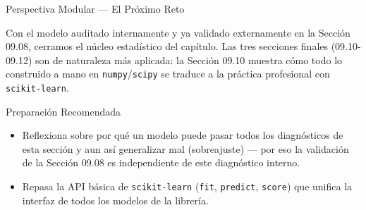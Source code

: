 \documentclass[10pt, aspectratio=169]{beamer}
\begin{document}
\begin{frame}{Perspectiva Modular --- El Próximo Reto}
  \scriptsize
  \begin{retoclase}
    Con el modelo auditado internamente y ya validado externamente en la Sección 09.08, cerramos el núcleo estadístico del capítulo. Las tres secciones finales (09.10-09.12) son de naturaleza más aplicada: la Sección 09.10 muestra cómo todo lo construido a mano en \texttt{numpy}/\texttt{scipy} se traduce a la práctica profesional con \texttt{scikit-learn}.
  \end{retoclase}

  \vspace{0.08cm}
  \pause
  \begin{alertblock}{Preparación Recomendada}
    \begin{itemize}\itemsep=0.06cm
      \item Reflexiona sobre por qué un modelo puede pasar todos los diagnósticos de esta sección y aun así generalizar mal (sobreajuste) --- por eso la validación de la Sección 09.08 es independiente de este diagnóstico interno.
      \item Repasa la API básica de \texttt{scikit-learn} (\texttt{fit}, \texttt{predict}, \texttt{score}) que unifica la interfaz de todos los modelos de la librería.
    \end{itemize}
  \end{alertblock}
\end{frame}
\end{document}
